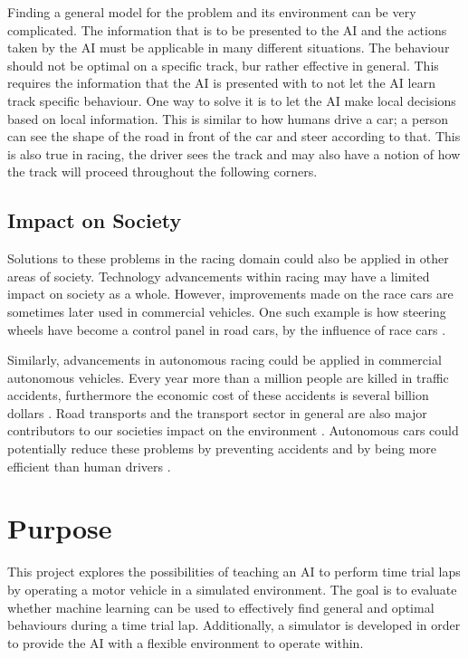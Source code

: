 Finding a general model for the problem and its environment can be very complicated. The information that is to be presented to the AI and the actions taken by the AI must be applicable in many different situations. The behaviour should not be optimal on a specific track, bur rather effective in general. This requires the information that the AI is presented with to not let the AI learn track specific behaviour. One way to solve it is to let the AI make local decisions based on local information. This is similar to how humans drive a car; a person can see the shape of the road in front of the car and steer according to that. This is also true in racing, the driver sees the track and may also have a notion of how the track will proceed throughout the following corners.

\subsection{Impact on Society}

Solutions to these problems in the racing domain could also be applied in other areas of society. Technology advancements within racing may have a limited impact on society as a whole. However, improvements made on the race cars are sometimes later used in commercial vehicles. One such example is how steering wheels have become a control panel in road cars, by the influence of race cars \cite{gkikas}. 

Similarly, advancements in autonomous racing could be applied in commercial autonomous vehicles. Every year more than a million people are killed in traffic accidents, furthermore the economic cost of these accidents is several billion dollars \cite{who:traffic}. Road transports and the transport sector in general are also major contributors to our societies impact on the environment \cite{fuglestvedt2008climate}. Autonomous cars could potentially reduce these problems by preventing accidents and by being more efficient than human drivers \cite{anderson}.


\section{Purpose}
\label{purpose}
This project explores the possibilities of teaching an AI to perform time trial laps by operating a motor vehicle in a simulated environment. The goal is to evaluate whether machine learning can be used to effectively find general and optimal behaviours during a time trial lap. Additionally, a simulator is developed in order to provide the AI with a flexible environment to operate within.


